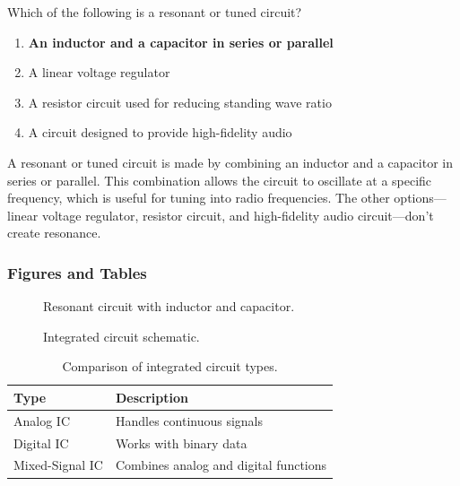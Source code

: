 \begin{tcolorbox}[colback=gray!10!white,colframe=black!75!black,title={T6D11}]
Which of the following is a resonant or tuned circuit?
\begin{enumerate}[label=\Alph*),noitemsep]
    \item \textbf{An inductor and a capacitor in series or parallel}
    \item A linear voltage regulator
    \item A resistor circuit used for reducing standing wave ratio
    \item A circuit designed to provide high-fidelity audio
\end{enumerate}
\end{tcolorbox}
A resonant or tuned circuit is made by combining an inductor and a capacitor in series or parallel. This combination allows the circuit to oscillate at a specific frequency, which is useful for tuning into radio frequencies. The other options—linear voltage regulator, resistor circuit, and high-fidelity audio circuit—don’t create resonance.

\subsubsection*{Figures and Tables}
\begin{figure}[h!]
    \centering
    \caption{Resonant circuit with inductor and capacitor.}
    \label{fig:resonant-circuit}
\end{figure}

\begin{figure}[h!]
    \centering
    \caption{Integrated circuit schematic.}
    \label{fig:ic}
\end{figure}

\begin{table}[h!]
    \centering
    \begin{tabular}{|l|l|}
        \hline
        \textbf{Type} & \textbf{Description} \\
        \hline
        Analog IC & Handles continuous signals \\
        Digital IC & Works with binary data \\
        Mixed-Signal IC & Combines analog and digital functions \\
        \hline
    \end{tabular}
    \caption{Comparison of integrated circuit types.}
    \label{tab:ics}
\end{table}
